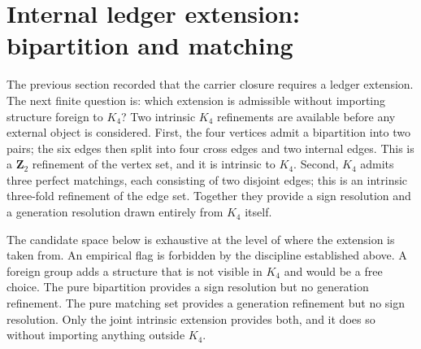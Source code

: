 \documentclass[11pt]{article}
\begin{document}
\section{Internal ledger extension: bipartition and matching}

The previous section recorded that the carrier closure requires a
ledger extension.  The next finite question is: which extension is
admissible without importing structure foreign to $K_4$?  Two intrinsic
$K_4$ refinements are available before any external object is
considered.  First, the four vertices admit a bipartition into two
pairs; the six edges then split into four cross edges and two internal
edges.  This is a $\mathbf{Z}_2$ refinement of the vertex set, and it
is intrinsic to $K_4$.  Second, $K_4$ admits three perfect matchings,
each consisting of two disjoint edges; this is an intrinsic three-fold
refinement of the edge set.  Together they provide a sign resolution
and a generation resolution drawn entirely from $K_4$ itself.

The candidate space below is exhaustive at the level of where the
extension is taken from.  An empirical flag is forbidden by the
discipline established above.  A foreign group adds a structure that is
not visible in $K_4$ and would be a free choice.  The pure bipartition
provides a sign resolution but no generation refinement.  The pure
matching set provides a generation refinement but no sign resolution.
Only the joint intrinsic extension provides both, and it does so
without importing anything outside $K_4$.
\end{document}

